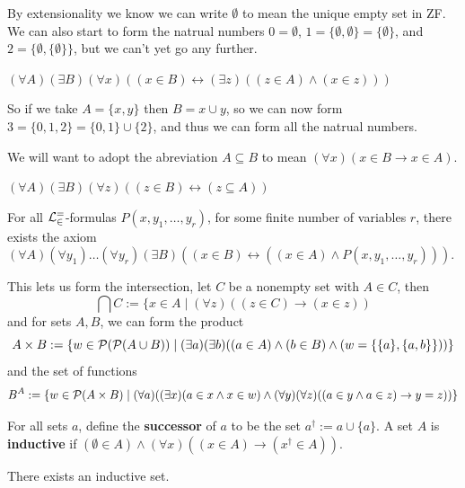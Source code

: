 \documentclass{article}
\begin{document}
By extensionality we know we can write $\emptyset$ to mean the unique empty set in ZF. We can also start to form the natrual numbers $0=\emptyset$, $1=\{\emptyset,\emptyset\} = \{\emptyset\}$, and $2=\{\emptyset,\{\emptyset\}\}$, but we can't yet go any further.

\begin{axiom}[Union]
    $(\forall A)(\exists B)(\forall x)((x\in B)\leftrightarrow(\exists z)((z\in A)\wedge (x\in z)))$
\end{axiom}

So if we take $A= \{x,y\}$ then $B = x\cup y$, so we can now form $3 = \{0,1,2\} = \{0,1\}\cup \{2\}$, and thus we can form all the natrual numbers.

We will want to adopt the abreviation $A\subseteq B$ to mean $(\forall x)(x\in B \rightarrow x \in A)$.

\begin{axiom}[Powerset]
    $(\forall A)(\exists B)(\forall z)((z\in B)\leftrightarrow (z\subseteq A))$
\end{axiom}

\begin{axiom}[Specification]
    For all $\mathcal{L}^=_\in$-formulas $P(x,y_1,\ldots,y_r)$, for some finite number of variables $r$, there exists the axiom $(\forall A)(\forall y_1)\dots (\forall y_r)(\exists B)((x\in B)\leftrightarrow ((x\in A)\wedge P(x,y_1,\ldots,y_r)))$.
\end{axiom}

This lets us form the intersection, let $C$ be a nonempty set with $A\in C$, then \[
\bigcap C := \{x\in A \mid (\forall z)((z \in C)\rightarrow (x\in z))
\] and for sets $A,B$, we can form the product \[
A\times B := \{w \in \mathcal{P}(\mathcal{P}(A\cup B)) \mid (\exists a)(\exists b)((a\in A)\wedge (b\in B)\wedge (w = \{\{a\},\{a,b\}\}))\}
\] and the set of functions \[
B^A := \{w \in \mathcal{P}(A\times B) \mid (\forall a)((\exists x)(a \in x \wedge x \in w) \wedge (\forall y)(\forall z)((a \in y \wedge a \in z)\rightarrow y = z))\}
\]

\begin{definition}
    For all sets $a$, define the \textbf{successor} of $a$ to be the set $a^\dagger := a\cup \{a\}$. A set $A$ is \textbf{inductive} if $(\emptyset \in A)\wedge (\forall x)((x\in A)\rightarrow (x^\dagger\in A))$.
\end{definition}

\begin{axiom}[Infinity]
    There exists an inductive set.
\end{axiom}
\end{document}
